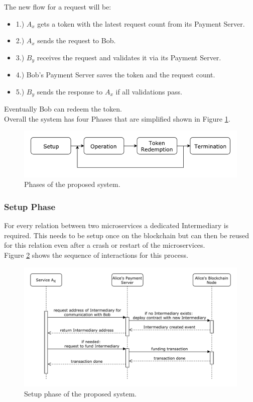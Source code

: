\documentclass[a4paper,12pt]{scrartcl}
\begin{document}
The new flow for a request will be:

\begin{itemize}
\item[] 1.) $A_x$ gets a token with the latest request count from its Payment Server.
\item[] 2.) $A_x$ sends the request to Bob.
\item[] 3.) $B_y$ receives the request and validates it via its Payment Server.
\item[] 4.) Bob's Payment Server saves the token and the request count.
\item[] 5.) $B_y$ sends the response to $A_x$ if all validations pass.
\end{itemize}

Eventually Bob can redeem the token.\\

Overall the system has four Phases that are simplified shown in Figure \ref{fig:Phases}.\\

\begin{figure}[H]
\centering
\includegraphics[width=350pt]{Images/Phases.pdf}
\caption{Phases of the proposed system.}
\label{fig:Phases}
\end{figure}

\subsubsection{Setup Phase}

For every relation between two microservices a dedicated Intermediary is required. This needs to be setup once on the blockchain but can then be reused for this relation even after a crash or restart of the microservices.\\
Figure \ref{fig:Setup} shows the sequence of interactions for this process.\\

\begin{figure}[H]
\centering
\includegraphics[width=450pt]{Images/Setup.pdf}
\caption{Setup phase of the proposed system.}
\label{fig:Setup}
\end{figure}
\end{document}
